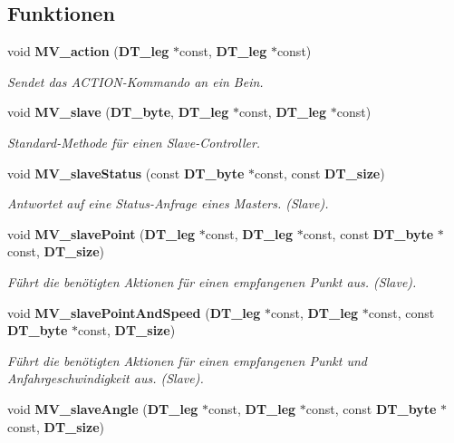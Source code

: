 \subsection*{Funktionen}
\begin{DoxyCompactItemize}
\item 
void {\bf MV\_\-action} ({\bf DT\_\-leg} $\ast$const, {\bf DT\_\-leg} $\ast$const)
\begin{DoxyCompactList}\small\item\em Sendet das ACTION-\/Kommando an ein Bein. \item\end{DoxyCompactList}\item 
void {\bf MV\_\-slave} ({\bf DT\_\-byte}, {\bf DT\_\-leg} $\ast$const, {\bf DT\_\-leg} $\ast$const)
\begin{DoxyCompactList}\small\item\em Standard-\/Methode für einen Slave-\/Controller. \item\end{DoxyCompactList}\item 
void {\bf MV\_\-slaveStatus} (const {\bf DT\_\-byte} $\ast$const, const {\bf DT\_\-size})
\begin{DoxyCompactList}\small\item\em Antwortet auf eine Status-\/Anfrage eines Masters. (Slave). \item\end{DoxyCompactList}\item 
void {\bf MV\_\-slavePoint} ({\bf DT\_\-leg} $\ast$const, {\bf DT\_\-leg} $\ast$const, const {\bf DT\_\-byte} $\ast$const, {\bf DT\_\-size})
\begin{DoxyCompactList}\small\item\em Führt die benötigten Aktionen für einen empfangenen Punkt aus. (Slave). \item\end{DoxyCompactList}\item 
void {\bf MV\_\-slavePointAndSpeed} ({\bf DT\_\-leg} $\ast$const, {\bf DT\_\-leg} $\ast$const, const {\bf DT\_\-byte} $\ast$const, {\bf DT\_\-size})
\begin{DoxyCompactList}\small\item\em Führt die benötigten Aktionen für einen empfangenen Punkt und Anfahrgeschwindigkeit aus. (Slave). \item\end{DoxyCompactList}\item 
void {\bf MV\_\-slaveAngle} ({\bf DT\_\-leg} $\ast$const, {\bf DT\_\-leg} $\ast$const, const {\bf DT\_\-byte} $\ast$const, {\bf DT\_\-size})

\end{DoxyCompactItemize}

